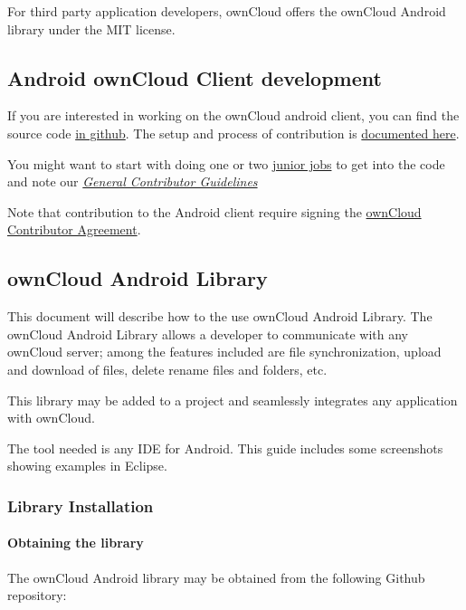 \documentclass[letterpaper,10pt,english]{sphinxmanual}
\begin{document}
For third party application developers, ownCloud offers the ownCloud Android
library under the MIT license.


\subsection{Android ownCloud Client development}
\label{android_library/index:android-owncloud-client-development}
If you are interested in working on the ownCloud android client, you can find
the source code \href{https://github.com/owncloud/android/}{in github}. The
setup and process of contribution is
\href{https://github.com/owncloud/android/blob/master/SETUP.md}{documented here}.

You might want to start with doing one or two \href{https://github.com/owncloud/android/issues?q=is\%3Aopen+is\%3Aissue+label\%3A\%22Junior+Job\%22}{junior jobs}
to get into the code and note our {\hyperref[general/index::doc]{\emph{General Contributor Guidelines}}}

Note that contribution to the Android client require signing the \href{https://owncloud.org/contribute/agreement/}{ownCloud Contributor Agreement}.


\subsection{ownCloud Android Library}
\label{android_library/index:owncloud-android-library}
This document will describe how to the use ownCloud Android Library.  The
ownCloud Android Library allows a developer to communicate with any ownCloud
server; among the features included are file synchronization, upload and
download of files, delete rename files and folders, etc.

This library may be added to a project and seamlessly integrates any
application with ownCloud.

The tool needed is any IDE for Android. This guide includes some screenshots
showing examples in Eclipse.


\subsubsection{Library Installation}
\label{android_library/library_installation:library-installation}\label{android_library/library_installation::doc}

\paragraph{Obtaining the library}
\label{android_library/library_installation:obtaining-the-library}
The ownCloud Android library may be obtained from the following Github repository:
\end{document}
